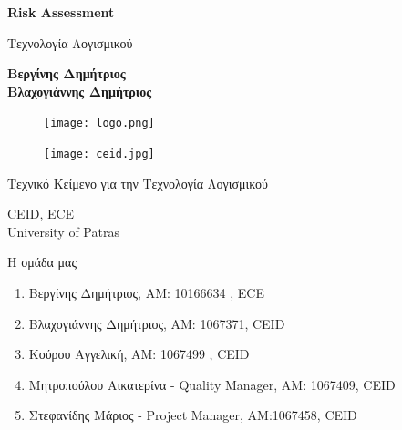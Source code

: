 \documentclass{article}
\begin{document}
\begin{titlepage}
   \begin{center}
       \vspace*{1cm}

       \textbf{\huge Risk Assessment}

       \vspace{0.5cm}
        Τεχνολογία Λογισμικού
            
       \vspace{1cm}

       \textbf{Βεργίνης Δημήτριος\\Βλαχογιάννης Δημήτριος}
       
       \begin{figure}[!htb]
        \centering
        \texttt{[image: logo.png]}
        \end{figure}
        
        \vspace{0.5cm}
        
        \begin{figure}[!htb]
        \centering
        \texttt{[image: ceid.jpg]}
        \end{figure}


       \vfill
            
       Τεχνικό Κείμενο για την Τεχνολογία Λογισμικού\\
            
       \vspace{0.5cm}
            
       CEID, ECE\\
       University of Patras\\
            
   \end{center}
\end{titlepage}

\noindent Η ομάδα μας

\begin{enumerate}
  \item Βεργίνης Δημήτριος, ΑΜ: 10166634 , ECE
  \item Βλαχογιάννης Δημήτριος, ΑΜ: 1067371, CEID
  \item Κούρου Αγγελική, ΑΜ: 1067499 , CEID
  \item Μητροπούλου Αικατερίνα - Quality Manager, ΑΜ: 1067409, CEID
  \item Στεφανίδης Μάριος - Project Manager, ΑΜ:1067458, CEID
\end{enumerate}
{
  \hypersetup{linkcolor=black}
  \tableofcontents
}
\end{document}
